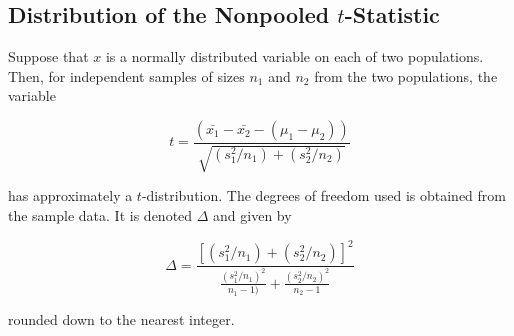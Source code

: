 \documentclass[12pt]{article}
\begin{document}
        \subsection*{Distribution of the Nonpooled $t$-Statistic}
            Suppose that $x$ is a normally distributed variable on each of two populations.
            Then, for independent samples of sizes $n_1$ and $n_2$ from the two populations,
            the variable
            \begin{center}
                \[
                    t = \frac{(\bar{x_1}-\bar{x_2}-(\mu_1-\mu_2))}
                             {\sqrt{(s_1^2/n_1)+(s_2^2/n_2)}}    
                \]
            \end{center}
            has approximately a $t$-distribution. The degrees of freedom used is obtained
            from the sample data. It is denoted $\Delta$ and given by
            \begin{center}
                \[
                    \Delta = \frac{[(s_1^2/n_1)+(s_2^2/n_2)]^2}
                                  {\frac{(s_1^2/n_1)^2}{n_1-1)}+\frac{(s_2^2/n_2)^2}{n_2-1}}   
                \]
            \end{center}
            rounded down to the nearest integer.
\end{document}

